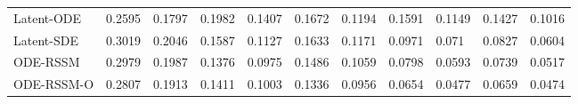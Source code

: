 \begin{table}[ht]
{\begin{tabular}{l|ll|ll|ll|ll|ll}
        \hline
        Latent-ODE            & \cellcolor{Green!60} 0.2595 & \cellcolor{Green!30} 0.1797 & 0.1982 & 0.1407  & 0.1672 & 0.1194 & 0.1591 & 0.1149  & 0.1427 & 0.1016            
             \\
        Latent-SDE       & 0.3019	&   0.2046                   & 0.1587	&   0.1127                 & 0.1633	&   0.1171                    & 0.0971	&   0.071               & 0.0827	&   0.0604
             \\    
        \hline
        ODE-RSSM              & 0.2979 & 0.1987                   & \cellcolor{Green!60} 0.1376 & \cellcolor{Green!60} 0.0975 & 0.1486 & 0.1059                   & 0.0798 & 0.0593                 & 0.0739 & 0.0517            \\
        ODE-RSSM-O            & 0.2807 & 0.1913 & 0.1411 & 0.1003                 & \cellcolor{Green!60} 0.1336 & \cellcolor{Green!60} 0.0956  & \cellcolor{Green!60} 0.0654 & \cellcolor{Green!60} 0.0477 & \cellcolor{Green!60} 0.0659 & \cellcolor{Green!60} 0.0474           \\
        \bottomrule
        \end{tabular}}
\label{tab:cstr}
\end{table} 


